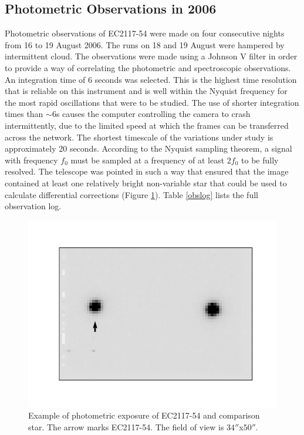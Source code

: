 \subsection{Photometric Observations in 2006}
\label{sub_observations}
Photometric observations of EC2117-54 were made on four consecutive nights from 16 to 19 August 2006. The runs on 18 and 19 August were hampered by intermittent cloud.  The observations were made using a Johnson V filter in order to provide a way of correlating the photometric and spectroscopic observations. An integration time of 6 seconds was selected. This is the highest time resolution that is reliable on this instrument and is well within the Nyquist frequency for the most rapid oscillations that were to be studied. The use of shorter integration times than $\sim6$s causes the computer controlling the camera to crash intermittently, due to the limited speed at which the frames can be transferred across the network.  The shortest timescale of the variations under study is approximately 20 seconds. According to the Nyquist sampling theorem, a signal with frequency $f_{0}$ must be sampled at a frequency of at least $2f_{0}$ to be fully resolved.  The telescope was pointed in such a way that ensured that the image contained at least one relatively bright non-variable star that could be used to calculate differential corrections (Figure \ref{exposure}). Table \ref{obslog} lists the full observation log.


\begin{figure}
\centering
\includegraphics[bb=0 0 600 400,width=0.85\columnwidth]{images/ec2117_phot_exp.png}
\caption[Example of photometric exposure]{Example of photometric exposure of EC2117-54 and comparison star. The arrow marks EC2117-54. The field of view is $34''$x$50''$.}
\label{exposure} 
\end{figure}

